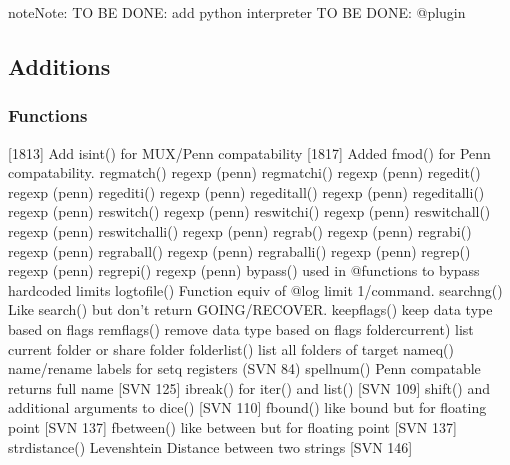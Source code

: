 \documentclass[letterpaper,10pt,english]{sphinxmanual}
\begin{document}
\begin{sphinxadmonition}{note}{Note:}
\sphinxAtStartPar
TO BE DONE: add python interpreter
TO BE DONE: @plugin
\end{sphinxadmonition}


\subsection{Additions}
\label{\detokenize{changelog:additions}}

\subsubsection{Functions}
\label{\detokenize{changelog:functions}}
\sphinxAtStartPar
{[}18\sphinxhyphen{}13{]} Add isint() for MUX/Penn compatability
{[}18\sphinxhyphen{}17{]} Added fmod() for Penn compatability.
regmatch()      \sphinxhyphen{} regexp (penn)
regmatchi()     \sphinxhyphen{} regexp (penn)
regedit()       \sphinxhyphen{} regexp (penn)
regediti()      \sphinxhyphen{} regexp (penn)
regeditall()    \sphinxhyphen{} regexp (penn)
regeditalli()   \sphinxhyphen{} regexp (penn)
reswitch()      \sphinxhyphen{} regexp (penn)
reswitchi()     \sphinxhyphen{} regexp (penn)
reswitchall()   \sphinxhyphen{} regexp (penn)
reswitchalli()  \sphinxhyphen{} regexp (penn)
regrab()        \sphinxhyphen{} regexp (penn)
regrabi()       \sphinxhyphen{} regexp (penn)
regraball()     \sphinxhyphen{} regexp (penn)
regraballi()    \sphinxhyphen{} regexp (penn)
regrep()        \sphinxhyphen{} regexp (penn)
regrepi()       \sphinxhyphen{} regexp (penn)
bypass()        \sphinxhyphen{} used in @functions to bypass hardcoded limits
logtofile()     \sphinxhyphen{} Function equiv of @log \sphinxhyphen{} limit 1/command.
searchng()      \sphinxhyphen{} Like search() but don’t return GOING/RECOVER.
keepflags()     \sphinxhyphen{} keep data type based on flags
remflags()      \sphinxhyphen{} remove data type based on flags
foldercurrent)  \sphinxhyphen{} list current folder or share folder
folderlist()    \sphinxhyphen{} list all folders of target
nameq()         \sphinxhyphen{} name/rename labels for setq registers (SVN 84)
spellnum()      \sphinxhyphen{} Penn compatable returns full name {[}SVN 125{]}
ibreak()        \sphinxhyphen{} for iter() and list() {[}SVN 109{]}
shift()         \sphinxhyphen{} and additional arguments to dice() {[}SVN 110{]}
fbound()        \sphinxhyphen{} like bound but for floating point {[}SVN 137{]}
fbetween()      \sphinxhyphen{} like between but for floating point {[}SVN 137{]}
strdistance()   \sphinxhyphen{} Levenshtein Distance between two strings {[}SVN 146{]}
\end{document}
